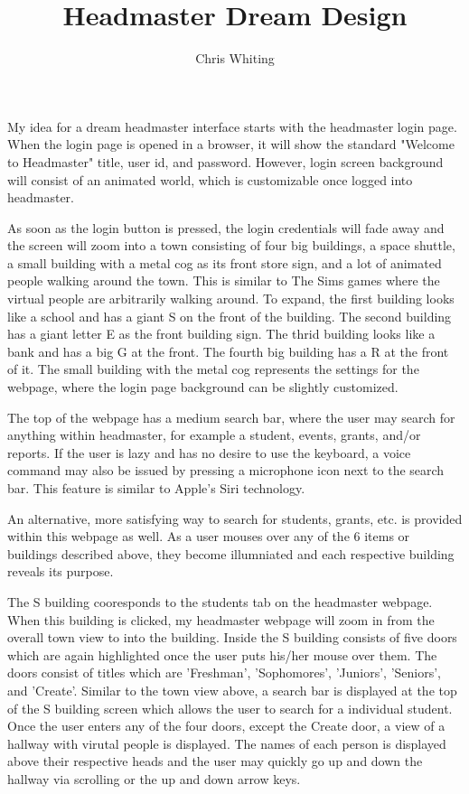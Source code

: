 \documentclass[11pt]{article}
\title{Headmaster Dream Design}
\author{Chris Whiting}
\begin{document}
\maketitle

 
My idea for a dream headmaster interface starts with the headmaster login page. When the login page is opened in a browser, it will show the standard "Welcome to Headmaster" title, user id, and password. However, login screen background will consist of an animated world, which is customizable once logged into headmaster.

As soon as the login button is pressed, the login credentials will fade away and the screen will zoom into a town consisting of four big buildings, a space shuttle, a small building with a metal cog as its front store sign, and a lot of animated people walking around the town. This is similar to The Sims games where the virtual people are arbitrarily walking around. To expand, the first building looks like a school and has a giant S on the front of the building. The second building has a giant letter E as the front building sign. The thrid building looks like a bank and has a big G at the front. The fourth big building has a R at the front of it. The small building with the metal cog represents the settings for the webpage, where the login page background can be slightly customized.

 The top of the webpage has a medium search bar, where the user may search for anything within headmaster, for example a student, events, grants, and/or reports. If the user is lazy and has no desire to use the keyboard, a voice command may also be issued by pressing a microphone icon next to the search bar. This feature is similar to Apple's Siri technology. 

An alternative, more satisfying way to search for students, grants, etc. is provided within this webpage as well. As a user mouses over any of the 6 items or buildings described above, they become illumniated and each respective building reveals its purpose. 

The S building cooresponds to the students tab on the headmaster webpage. When this building is clicked, my headmaster webpage will zoom in from the overall town view to into the building. Inside the S building consists of five doors which are again highlighted once the user puts his/her mouse over them. The doors consist of titles which are 'Freshman', 'Sophomores', 'Juniors', 'Seniors', and 'Create'. Similar to the town view above, a search bar is displayed at the top of the S building screen which allows the user to search for a individual student. Once the user enters any of the four doors, except the Create door, a view of a hallway with virutal people is displayed. The names of each person is displayed above their respective heads and the user may quickly go up and down the hallway via scrolling or the up and down arrow keys. 
\end{document}
